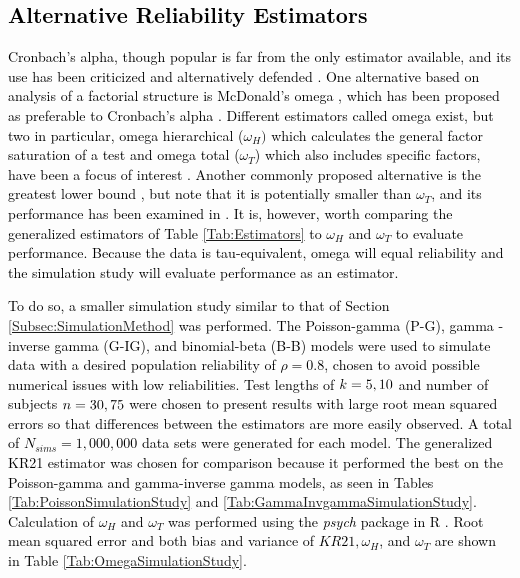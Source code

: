 \documentclass[12pt,epsfig]{article}
\newcommand{\changed}[1]{\textcolor{black}{#1}}
\newcommand{\numsubjects}{\changed{n}}%
\newcommand{\testlength}{\changed{k}}%
\begin{document}

\subsection{\changed{Alternative Reliability Estimators}}
\label{Subsec:OmegaTest}

\changed{Cronbach's alpha, though popular is far from the only estimator available, and its use has been criticized \citep{Sijtsma2009, Mcneish2017} and alternatively defended \citep{Raykov2019}. One alternative based on analysis of a factorial structure  is McDonald's omega \citep{Mcdonald1999}, which has been  proposed  as preferable to Cronbach's alpha \citep{Mcneish2017, Hayes2020}. Different estimators called omega exist, but two in particular, omega hierarchical ($\omega_H)$ which calculates the general factor saturation of a test and omega total ($\omega_{T}$) which also includes specific factors, have been a focus of interest \citep{Revelle2009, Savalei2019}. Another commonly proposed alternative is the greatest lower bound \citep{Sijtsma2009, Trizano2016}, but \cite{Revelle2009} note that it is potentially smaller than $\omega_T$, and its performance has been examined in \cite{Trizano2016}. It is, however, worth comparing the generalized estimators of Table \ref{Tab:Estimators} to  $\omega_H$ and $\omega_{T}$ to evaluate performance.  Because the data is tau-equivalent,  omega will equal reliability and the simulation study will evaluate performance as an estimator.}

\changed{To do so, a smaller simulation study similar to that of Section \ref{Subsec:SimulationMethod} was performed. The Poisson-gamma (P-G), gamma - inverse gamma (G-IG), and binomial-beta (B-B) models were used to simulate data with a desired population reliability of $\rho = 0.8$, chosen to avoid possible numerical issues with low reliabilities. Test lengths of $\testlength = 5, 10$ and number of subjects $\numsubjects = 30, 75$ were chosen to present results with large root mean squared errors so that differences between the estimators are more easily observed. A total of $N_{sims} = 1,000,000$ data sets were generated for each model. The generalized KR21 estimator was chosen for comparison because it performed the best on the Poisson-gamma and gamma-inverse gamma models, as seen in Tables \ref{Tab:PoissonSimulationStudy} and \ref{Tab:GammaInvgammaSimulationStudy}. Calculation of $\omega_H$ and $\omega_{T}$ was performed using the \emph{psych} package in R \citep{PsychPackage}. Root mean squared error and both bias and variance of $KR21, \omega_{H}$, and $\omega_{T}$ are shown in Table \ref{Tab:OmegaSimulationStudy}.}
\end{document}
